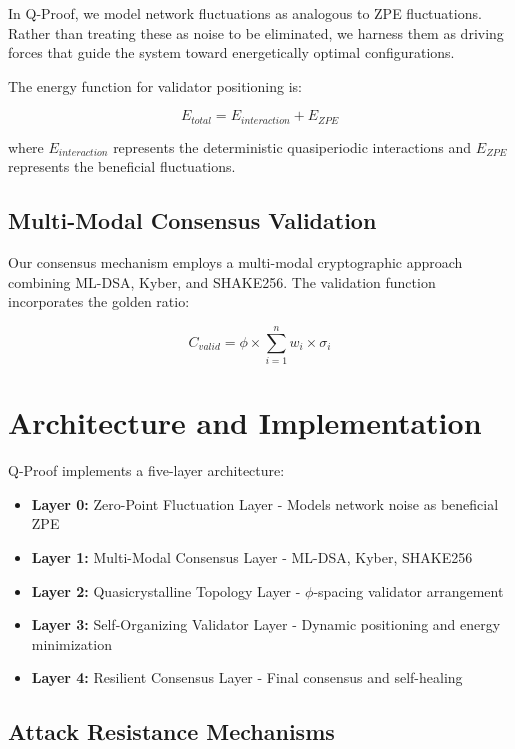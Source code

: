 \documentclass[AMA]{WileyNJD-AMA}
\begin{document}
In Q-Proof, we model network fluctuations as analogous to ZPE fluctuations. Rather than treating these as noise to be eliminated, we harness them as driving forces that guide the system toward energetically optimal configurations.

The energy function for validator positioning is:

\begin{equation}
E_{total} = E_{interaction} + E_{ZPE}
\label{eq:energy_function}
\end{equation}

where $E_{interaction}$ represents the deterministic quasiperiodic interactions and $E_{ZPE}$ represents the beneficial fluctuations.

\subsection{Multi-Modal Consensus Validation}

Our consensus mechanism employs a multi-modal cryptographic approach combining ML-DSA, Kyber, and SHAKE256. The validation function incorporates the golden ratio:

\begin{equation}
C_{valid} = \phi \times \sum_{i=1}^{n} w_i \times \sigma_i
\label{eq:validation}
\end{equation}

\section{Architecture and Implementation}

Q-Proof implements a five-layer architecture:

\begin{itemize}
    \item \textbf{Layer 0:} Zero-Point Fluctuation Layer - Models network noise as beneficial ZPE
    \item \textbf{Layer 1:} Multi-Modal Consensus Layer - ML-DSA, Kyber, SHAKE256
    \item \textbf{Layer 2:} Quasicrystalline Topology Layer - $\phi$-spacing validator arrangement
    \item \textbf{Layer 3:} Self-Organizing Validator Layer - Dynamic positioning and energy minimization
    \item \textbf{Layer 4:} Resilient Consensus Layer - Final consensus and self-healing
\end{itemize}

\subsection{Attack Resistance Mechanisms}
\end{document}
